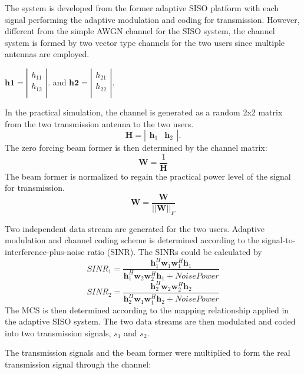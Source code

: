 \documentclass[journal,comsoc]{IEEEtran}
\begin{document}
The system is developed from the former adaptive SISO platform with each signal performing the adaptive modulation and coding for transmission.
However, different from the simple AWGN channel for the SISO system, the channel system is formed by two vector type channels for the two users since multiple antennas are employed.
\begin{center}
\(\textbf{h1} = \left| \begin{array}{c}
h_{11} \\
h_{12} \\
\end{array} \right|.\)
and \(\textbf{h2} = \left| \begin{array}{c}
h_{21} \\
h_{22} \\
\end{array} \right|.\)
\end{center}
In the practical simulation, the channel is generated as a random 2x2 matrix from the two transmission antenna to the two users.
\[ \textbf{H} = \left| \begin{array}{cc}
\textbf{h}_{1} & \textbf{h}_{2}
\end{array} \right|.\]
The zero forcing beam former is then determined by the channel matrix:
\[\textbf{W} = \frac{1}{\textbf{H}}\]
The beam former is normalized to regain the practical power level of the signal for transmission.
\[\textbf{W} = \frac{\textbf{W}}{\left|\left|\textbf{W}\right|\right|_F}\]

 Two independent data stream are generated for the two users. Adaptive modulation and channel coding scheme is determined according to the signal-to-interference-plus-noise ratio (SINR). The SINRs could be calculated by
 \[SINR_1 = \frac{\textbf{h}_1^H\textbf{w}_1\textbf{w}_1^H\textbf{h}_1}{\textbf{h}_1^H\textbf{w}_2\textbf{w}_2^H\textbf{h}_1+NoisePower}\]
 \[SINR_2 = \frac{\textbf{h}_2^H\textbf{w}_2\textbf{w}_2^H\textbf{h}_2}{\textbf{h}_2^H\textbf{w}_1\textbf{w}_1^H\textbf{h}_2+NoisePower}\]
The MCS is then determined according to the mapping relationship applied in the adaptive SISO system. The two data streams are then modulated and coded into two transmission signals, \(s_1\) and \(s_2\).

The transmission signals and the beam former were multiplied to form the real transmission signal through the channel:
\end{document}
